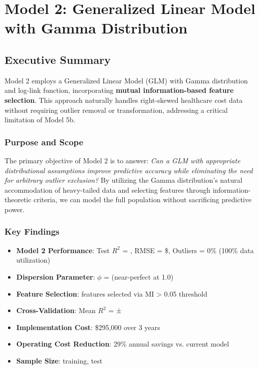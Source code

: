 \chapter{Model 2: Generalized Linear Model with Gamma Distribution}\label{ch:model2}




\def\themodel{2}

\section{Executive Summary}

Model 2 employs a Generalized Linear Model (GLM) with Gamma distribution and log-link function, incorporating \textbf{mutual information-based feature selection}. This approach naturally handles right-skewed healthcare cost data without requiring outlier removal or transformation, addressing a critical limitation of Model 5b.

\subsection{Purpose and Scope}

The primary objective of Model 2 is to answer: \textit{Can a GLM with appropriate distributional assumptions improve predictive accuracy while eliminating the need for arbitrary outlier exclusion?} By utilizing the Gamma distribution's natural accommodation of heavy-tailed data and selecting features through information-theoretic criteria, we can model the full population without sacrificing predictive power.

\subsection{Key Findings}

\begin{itemize}
    \item \textbf{Model 2 Performance}: Test $R^2$ = \ModelTwoRSquaredTest, RMSE = \$\ModelTwoRMSETest, Outliers = 0\% (100\% data utilization)
    \item \textbf{Dispersion Parameter}: $\phi$ = \ModelTwoDispersion{} (near-perfect at 1.0)
    \item \textbf{Feature Selection}: \ModelTwoNumFeatures{} features selected via MI > 0.05 threshold
    \item \textbf{Cross-Validation}: Mean $R^2$ = \ModelTwoCVMean{} ± \ModelTwoCVStd
    \item \textbf{Implementation Cost}: \$295,000 over 3 years
    \item \textbf{Operating Cost Reduction}: 29\% annual savings vs. current model
    \item \textbf{Sample Size}: \ModelTwoTrainingSamples{} training, \ModelTwoTestSamples{} test
\end{itemize}

